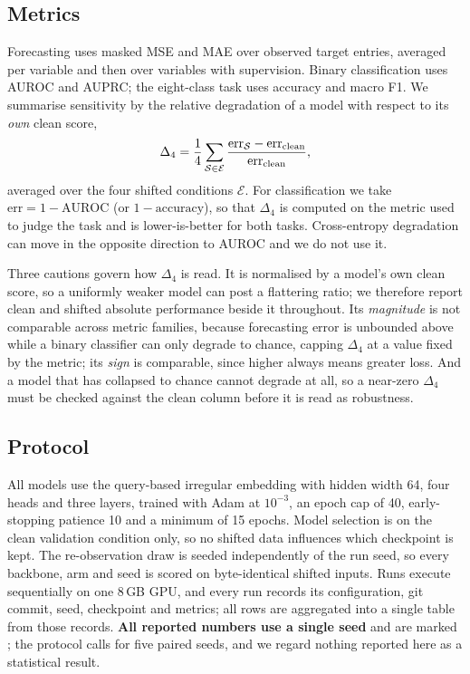 \subsection{Metrics}
Forecasting uses masked MSE and MAE over observed target entries, averaged per variable and then over variables
with supervision. Binary classification uses AUROC and AUPRC; the eight-class task uses accuracy and macro F1.
We summarise sensitivity by the relative degradation of a model with respect to its \emph{own} clean score,
\begin{equation}
\Delta_{4}=\frac{1}{4}\sum_{\mathcal{S}\in\mathcal{E}}
\frac{\mathrm{err}_{\mathcal{S}}-\mathrm{err}_{\mathrm{clean}}}{\mathrm{err}_{\mathrm{clean}}},
\label{eq:degradation}
\end{equation}
averaged over the four shifted conditions $\mathcal{E}$. For classification we take
$\mathrm{err}=1-\mathrm{AUROC}$ (or $1-\mathrm{accuracy}$), so that $\Delta_4$ is computed on the metric used to
judge the task and is lower-is-better for both tasks. Cross-entropy degradation can move in the opposite
direction to AUROC and we do not use it.

Three cautions govern how $\Delta_4$ is read. It is normalised by a model's own clean score, so a uniformly weaker
model can post a flattering ratio; we therefore report clean and shifted absolute performance beside it
throughout. Its \emph{magnitude} is not comparable across metric families, because forecasting error is unbounded
above while a binary classifier can only degrade to chance, capping $\Delta_4$ at a value fixed by the metric; its
\emph{sign} is comparable, since higher always means greater loss. And a model that has collapsed to chance cannot
degrade at all, so a near-zero $\Delta_4$ must be checked against the clean column before it is read as
robustness.

\subsection{Protocol}
All models use the query-based irregular embedding with hidden width 64, four heads and three layers, trained with
Adam at $10^{-3}$, an epoch cap of 40, early-stopping patience 10 and a minimum of 15 epochs. Model selection is
on the clean validation condition only, so no shifted data influences which checkpoint is kept. The
re-observation draw is seeded independently of the run seed, so every backbone, arm and seed is scored on
byte-identical shifted inputs. Runs execute sequentially on one 8\,GB GPU, and every run records its
configuration, git commit, seed, checkpoint and metrics; all rows are aggregated into a single table from those
records. \textbf{All reported numbers use a single seed} and are marked \prelim; the protocol calls for five
paired seeds, and we regard nothing reported here as a statistical result. 
